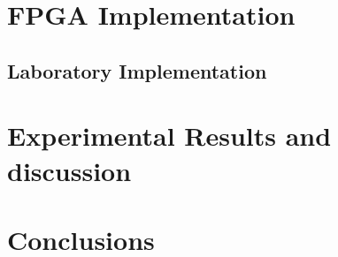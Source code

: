 \documentclass{article}
\begin{document}
\section{FPGA Implementation}
\subsection{Laboratory Implementation}




\section{Experimental Results and discussion}





\section{Conclusions}






\end{document}
